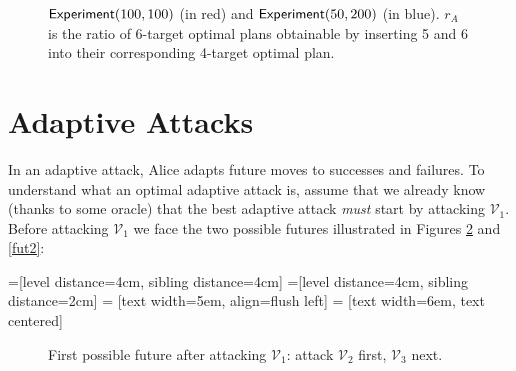 \documentclass[11pt]{llncs}
\newcommand{\atk}{\begin{turn}{130}{\scriptsize \Lightning}\end{turn}}
\newcommand{\tk}{\raisebox{1ex}{\atk}}
\newcommand{\LL}[2]{\mbox{\tk $\mathcal{V}_{#1}$,~{\scriptsize \StopWatchEnd} #2}}
\begin{document}
\begin{figure}[!h]
\begin{center}
\end{center}
\caption{$\mbox{{\sf Experiment}}(100,100)$ (in red) and $\mbox{{\sf Experiment}}(50,200)$ (in blue). $r_A$ is the ratio of 6-target optimal plans obtainable by inserting 5 and 6 into their corresponding 4-target optimal plan.}
\label{fig}
\end{figure}

\section{Adaptive Attacks}

In an adaptive attack, Alice adapts future moves to successes and failures. To understand what an optimal adaptive attack is, assume that we already know (thanks to some oracle) that the best adaptive attack {\sl must} start by attacking $\mathcal{V}_1$. Before attacking $\mathcal{V}_1$ we face the two possible futures illustrated in Figures \ref{fut1} and \ref{fut2}:

=[level distance=4cm, sibling distance=4cm]
=[level distance=4cm, sibling distance=2cm]
 = [text width=5em, align=flush left] %
 = [text width=6em, text centered] %

\begin{figure}[!h]
\begin{center}
\end{center}
\caption{First possible future after attacking $\mathcal{V}_1$: attack $\mathcal{V}_2$ first, $\mathcal{V}_3$ next.}
\label{fut1}
\end{figure}
\end{document}
